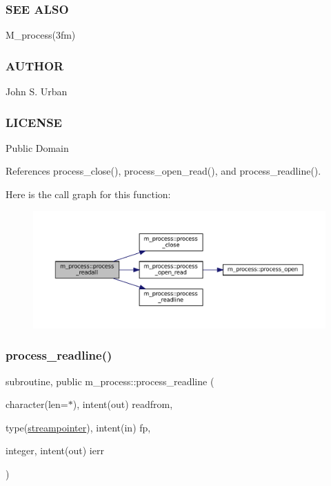 \subsubsection*{S\+EE A\+L\+SO}

M\+\_\+process(3fm) \subsubsection*{A\+U\+T\+H\+OR}

John S. Urban \subsubsection*{L\+I\+C\+E\+N\+SE}

Public Domain 

References process\+\_\+close(), process\+\_\+open\+\_\+read(), and process\+\_\+readline().

Here is the call graph for this function\+:\nopagebreak
\begin{figure}[H]
\begin{center}
\leavevmode
\includegraphics[width=350pt]{namespacem__process_a7dd759a1344789477ae1e205d7fa9a51_cgraph}
\end{center}
\end{figure}
\mbox{\label{namespacem__process_acbc72c5ed371430a471aa1f3010fbbda}} 
\subsubsection{\texorpdfstring{process\+\_\+readline()}{process\_readline()}}
{\footnotesize\ttfamily subroutine, public m\+\_\+process\+::process\+\_\+readline (\begin{DoxyParamCaption}\item[{character(len=$\ast$), intent(out)}]{readfrom,  }\item[{type(\mbox{\hyperlink{structm__process_1_1streampointer}{streampointer}}), intent(in)}]{fp,  }\item[{integer, intent(out)}]{ierr }\end{DoxyParamCaption})}




